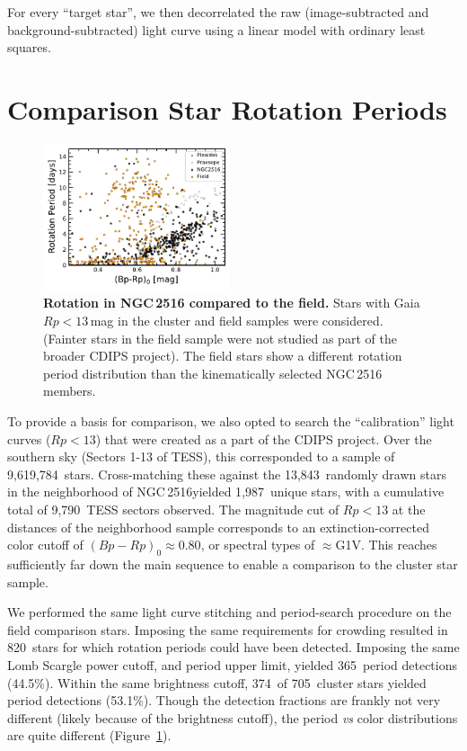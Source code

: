\documentclass[12pt,twocolumn,tighten]{aastex63}
\newcommand{\cn}{NGC\,2516} %
\newcommand{\ncalibration}{9{,}619{,}784\ } %
\newcommand{\nnbhd}{13{,}843\ } %
\newcommand{\nnbhdcaliblc}{9{,}790\ } %
\newcommand{\nnbhdcalibstar}{1{,}987\ } %
\newcommand{\ncompstardenominator}{820\ } %
\newcommand{\ncompstarnumerator}{365\ } %
\newcommand{\ncompfrac}{44.5\%} %
\newcommand{\nautovscompstardenominator}{705\ } %
\newcommand{\nautovscompstarnumerator}{374\ } %
\newcommand{\nautofrac}{53.1\%} %
\begin{document}
For every ``target star'', we then decorrelated the raw
(image-subtracted and background-subtracted) light curve
using a linear model with ordinary least squares.

\section{Comparison Star Rotation Periods}
\label{app:compstar}

\begin{figure}[t]
	\begin{center}
		\leavevmode
    \includegraphics[width=0.49\textwidth]{f9.pdf}
	\end{center}
	\vspace{-0.7cm}
	\caption{ {\bf Rotation in NGC\,2516 compared to the field.}
  Stars with Gaia $Rp<13$\,mag in the cluster and field samples were
  considered. (Fainter stars in the field sample were not studied as part
  of the broader CDIPS project).
  The field stars show a different rotation period distribution than
  the kinematically selected NGC\,2516 members.
  \label{fig:compstar}
	}
\end{figure}

To provide a basis for comparison, we also opted to search the
``calibration'' light curves ($Rp<13$) that were created as a part of
the CDIPS project.  Over the southern sky (Sectors 1-13 of TESS), this
corresponded to a sample of \ncalibration stars.  Cross-matching these
against the \nnbhd randomly drawn stars in the neighborhood of \cn yielded
\nnbhdcalibstar unique stars, with a cumulative total of \nnbhdcaliblc TESS
sectors observed.
The magnitude cut of $Rp<13$ at the distances of the neighborhood sample
corresponds to an extinction-corrected color cutoff of $(Bp-Rp)_0
\approx 0.80$, or spectral types of $\approx$G1V.
This reaches sufficiently far down the main sequence to enable a
comparison to the cluster star sample.

We performed the same light curve stitching and period-search
procedure on the field comparison stars.
Imposing the same requirements for crowding resulted in
\ncompstardenominator stars for which rotation periods could have been
detected.
Imposing the same Lomb Scargle power cutoff, and period upper limit,
yielded \ncompstarnumerator period detections (\ncompfrac).
Within the same brightness cutoff, 
\nautovscompstarnumerator of \nautovscompstardenominator cluster stars
yielded period detections (\nautofrac).
Though the detection fractions are frankly not very different
(likely because of the brightness cutoff), the period {\it
vs} color distributions are quite different
(Figure~\ref{fig:compstar}).
\end{document}
